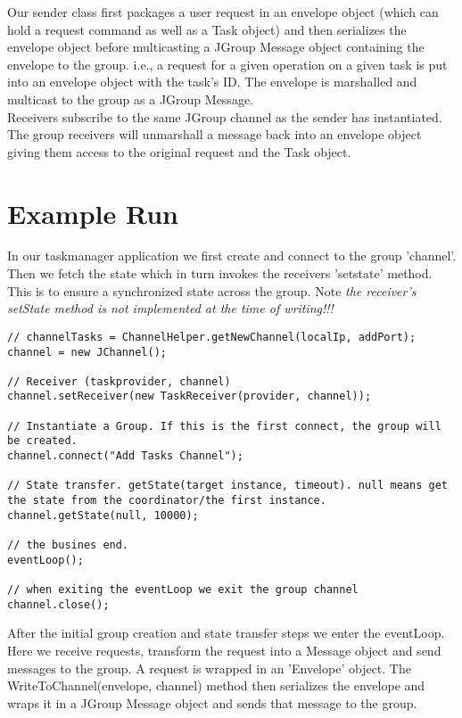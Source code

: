 Our sender class first packages a user request in an envelope object (which can hold a request command as well as a Task object) and then serializes the envelope object before multicasting a JGroup Message object containing the envelope to the group. i.e., a request for a given operation on a given task is put into an envelope object with the task's ID. The envelope is marshalled and multicast to the group as a JGroup Message.\\

Receivers subscribe to the same JGroup channel as the sender has instantiated. The group receivers will unmarshall a message back into an envelope object giving them access to the original request and the Task object. \\

\section{Example Run}
\label{jgroup_run}
In our taskmanager application we first create and connect to the group 'channel'. Then we fetch the state which in turn invokes the receivers 'setstate' method. This is to ensure a synchronized state across the group. Note \textit{the receiver's setState method is not implemented at the time of writing!!!}   

\begin{lstlisting}[caption=group setup]
// channelTasks = ChannelHelper.getNewChannel(localIp, addPort);
channel = new JChannel();

// Receiver (taskprovider, channel) 
channel.setReceiver(new TaskReceiver(provider, channel));

// Instantiate a Group. If this is the first connect, the group will be created.
channel.connect("Add Tasks Channel");

// State transfer. getState(target instance, timeout). null means get the state from the coordinator/the first instance.        
channel.getState(null, 10000);

// the busines end.
eventLoop();

// when exiting the eventLoop we exit the group channel
channel.close();
\end{lstlisting}

After the initial group creation and state transfer steps we enter the eventLoop. Here we receive requests, transform the request 
into a Message object and send messages to the group. A request is wrapped in an 'Envelope' object. The WriteToChannel(envelope, channel) method then serializes the envelope and wraps it in a JGroup Message object and sends that message to the group.\\


